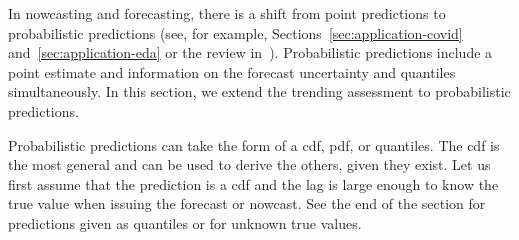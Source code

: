 In nowcasting and forecasting, there is a shift from point predictions to probabilistic predictions (see, for example, Sections~\ref{sec:application-covid} and~\ref{sec:application-eda} or the review in~\cite{Gneiting2014}).
Probabilistic predictions include a point estimate and information on the forecast uncertainty and quantiles simultaneously.
In this section, we extend the trending assessment to probabilistic predictions.

Probabilistic predictions can take the form of a \ac{cdf}, \ac{pdf}, or quantiles.
The \ac{cdf} is the most general and can be used to derive the others, given they exist.
Let us first assume that the prediction is a \ac{cdf} and the lag is large enough to know the true value when issuing the forecast or nowcast.
See the end of the section for predictions given as quantiles or for unknown true values.

